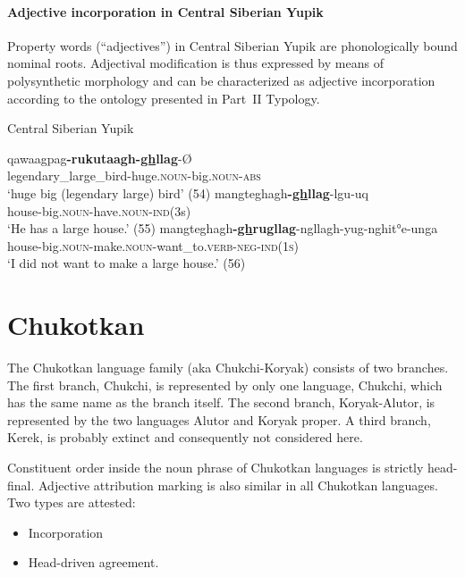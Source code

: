 \paragraph*{Adjective incorporation in Central Siberian Yupik}
Property words (“adjectives”) in Central Siberian Yupik are phonologically bound nominal roots. Adjectival modification is thus expressed by means of polysynthetic morphology and can be characterized as adjective incorporation according to the ontology presented in Part~II Typology.
\begin{exe}
\ex \rm{Central Siberian Yupik \citep{de-reuse1994}}
\begin{xlist}
\ex
\gll	qawaagpag\textbf{-rukutaagh-\underline{gh}llag}-Ø\\
	legendary\_large\_bird-huge.\textsc{noun}-big.\textsc{noun}-\textsc{abs}\\
\glt	‘huge big (legendary large) bird’ (54)
\ex	
\gll	mangteghagh\textbf{-\underline{gh}llag}-lgu-uq\\
	house-big.\textsc{noun}-have.\textsc{noun}-\textsc{ind}(3s)\\
\glt	‘He has a large house.’ (55)
\ex	
\gll	mangteghagh\textbf{-\underline{gh}rugllag}-ngllagh-yug-nghit°e-unga\\
	house-big.\textsc{noun}-make.\textsc{noun}-want\_to.\textsc{verb}-\textsc{neg}-\textsc{ind(1s)}\\
\glt	‘I did not want to make a large house.’ (56)
\end{xlist}
\end{exe}

\section{Chukotkan}
The Chukotkan language family (aka Chukchi-Koryak) consists of two branches. The first branch, Chukchi, is represented by only one language, Chukchi, which has the same name as the branch itself. The second branch, Koryak-Alutor, is represented by the two languages Alutor and Koryak proper. A third branch, Kerek, is probably extinct \cite[253]{salminen2007} and consequently not considered here.

Constituent order inside the noun phrase of Chukotkan languages is strictly head-final. Adjective attribution marking is also similar in all Chukotkan languages. Two types are attested:
\begin{itemize}
\item Incorporation
\item Head\hyp{}driven agreement.
\end{itemize}

